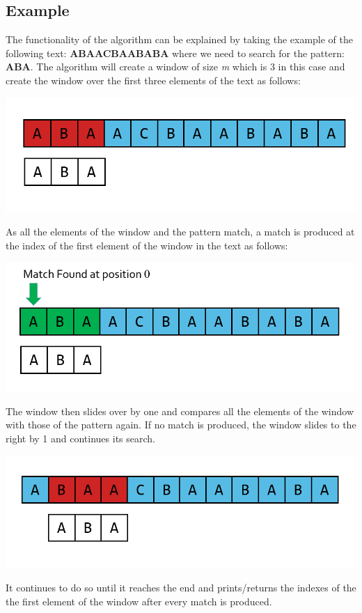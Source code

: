 \documentclass[a4paper, 12pt]{report}
\begin{document}
    \subsection{Example}
    The functionality of the algorithm can be explained by taking the example of the following text: \textbf{ABAACBAABABA} where we need to search for the pattern: \textbf{ABA}. 
    The algorithm will create a window of size \textit{m} which is 3 in this case and create the window over the first three elements of the text as follows:
    \begin{center}
        \includegraphics[scale = 0.75]{brute1.PNG}
    \end{center}
    As all the elements of the window and the pattern match, a match is produced at the index of the first element of the window in the text as follows:
    \begin{center}
        \includegraphics[scale = 0.76]{brute2.PNG}
    \end{center}
    The window then slides over by one and compares all the elements of the window with those of the pattern again. If no match is produced, the window slides to the right by 1 and continues its search. 
    \begin{center}
        \includegraphics[scale = 0.75]{brute3.PNG}
    \end{center}
    It continues to do so until it reaches the end and prints/returns the indexes of the the first element of the window after every match is produced.
\end{document}
